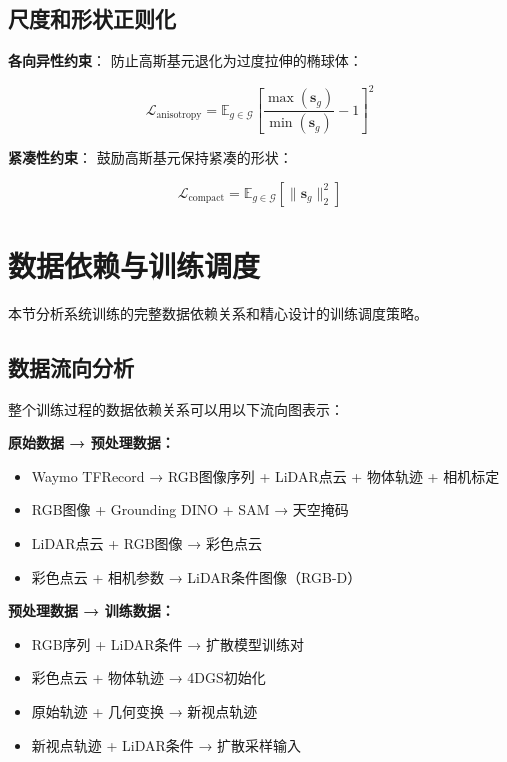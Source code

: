 \subsection{尺度和形状正则化}

\textbf{各向异性约束}：
防止高斯基元退化为过度拉伸的椭球体：

\begin{equation}
\mathcal{L}_{\text{anisotropy}} = \mathbb{E}_{g \in \mathcal{G}} \left[ \frac{\max(\mathbf{s}_g)}{\min(\mathbf{s}_g)} - 1 \right]^2
\label{eq:anisotropy_regularization}
\end{equation}

\textbf{紧凑性约束}：
鼓励高斯基元保持紧凑的形状：

\begin{equation}
\mathcal{L}_{\text{compact}} = \mathbb{E}_{g \in \mathcal{G}} \left[ \|\mathbf{s}_g\|_2^2 \right]
\label{eq:compactness_regularization}
\end{equation}

\section{数据依赖与训练调度}

本节分析系统训练的完整数据依赖关系和精心设计的训练调度策略。

\subsection{数据流向分析}

整个训练过程的数据依赖关系可以用以下流向图表示：

\textbf{原始数据 → 预处理数据：}
\begin{itemize}
\item Waymo TFRecord → RGB图像序列 + LiDAR点云 + 物体轨迹 + 相机标定
\item RGB图像 + Grounding DINO + SAM → 天空掩码
\item LiDAR点云 + RGB图像 → 彩色点云
\item 彩色点云 + 相机参数 → LiDAR条件图像（RGB-D）
\end{itemize}

\textbf{预处理数据 → 训练数据：}
\begin{itemize}
\item RGB序列 + LiDAR条件 → 扩散模型训练对
\item 彩色点云 + 物体轨迹 → 4DGS初始化
\item 原始轨迹 + 几何变换 → 新视点轨迹
\item 新视点轨迹 + LiDAR条件 → 扩散采样输入
\end{itemize}


